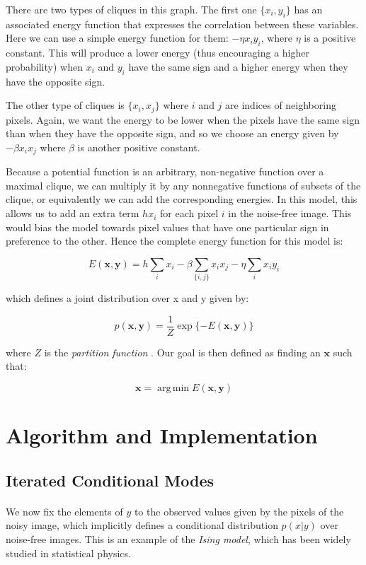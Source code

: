 \documentclass{article}
\begin{document}
There are two types of cliques in this graph. The first one $\{x_i, y_i\}$ has an associated energy function that expresses the correlation between these variables. Here we can use a simple energy function for them: $-\eta x_i y_i$, where $\eta$ is a positive constant. This will produce a lower energy (thus encouraging a higher probability) when $x_i$ and $y_i$ have the same sign and a higher energy when they have the opposite sign.

The other type of cliques is $\{x_i, x_j\}$ where $i$ and $j$ are indices of neighboring pixels. Again, we want the energy to be lower when the pixels have the same sign than when they have the opposite sign, and so we choose an energy given by $-\beta x_i x_j$ where $\beta$ is another positive constant. 

Because a potential function is an arbitrary, non-negative function over a maximal clique, we can multiply it by any nonnegative functions of subsets of the clique, or equivalently we can add the corresponding energies. In this model, this allows us to add an extra term $hx_i$ for each pixel $i$ in the noise-free image. This would bias the model towards pixel values that have one particular sign in preference to the other. Hence the complete energy function for this model is:

$$
E(\mathbf{x}, \mathbf{y}) = h \sum_{i}x_i - \beta\sum_{\{i, j\}}x_ix_j - \eta\sum_{i}x_iy_i
$$

which defines a joint distribution over x and y given by:

$$
p(\mathbf{x}, \mathbf{y}) = \frac{1}{Z}\exp\{-E(\mathbf{x}, \mathbf{y})\}
$$

where $Z$ is the \textit{partition function} \cite{bishop2006pattern}. Our goal is then defined as finding an $\mathbf{x}$ such that:

$$
\mathbf{x} = {\operatorname{arg\,min}} E(\mathbf{x}, \mathbf{y})
$$

\section{Algorithm and Implementation}

\subsection{Iterated Conditional Modes}
\paragraph{}
We now fix the elements of $y$ to the observed values given by the pixels of the noisy image, which implicitly defines a conditional distribution $p(x|y)$ over noise-free images. This is an example of the \textit{Ising model}, which has been widely studied in statistical physics. 
\end{document}
